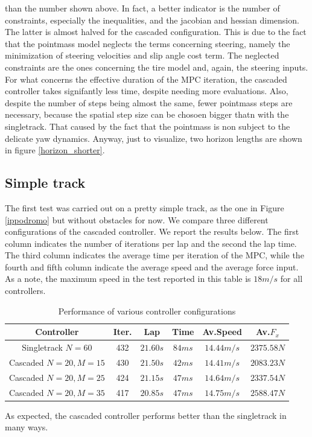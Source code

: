 \documentclass[a4paper, onecolumn, 12pt]{article}
\begin{document}
than the number shown above. In fact, a better indicator is the number of
constraints, especially the inequalities, and the jacobian and hessian
dimension. The latter is almost halved for the cascaded configuration. This is
due to the fact that the pointmass model neglects the terms concerning steering,
namely the minimization of steering velocities and slip angle cost term. The
neglected constraints are the ones concerning the tire model and, again, the
steering inputs. For what concerns the effective duration of the MPC iteration,
the cascaded controller takes signifantly less time, despite needing more
evaluations. Also, despite the number of steps being almost the same, fewer
pointmass steps are necessary, because the spatial step size can be chosoen
bigger thatn with the singletrack. That caused by the fact that the pointmass is
non subject to the delicate yaw dynamics. Anyway, just to visualize, two horizon
lengths are shown in figure \ref{horizon_shorter}.


\subsection{Simple track}

The first test was carried out on a pretty simple track, as the one in Figure
\ref{ippodromo} but without obstacles for now. We compare three different
configurations of the cascaded controller. We report the results below. The
first column indicates the number of iterations per lap and the second the lap
time. The third column indicates the average time per iteration of the MPC,
while the fourth and fifth column indicate the average speed and the average
force input. As a note, the maximum speed in the test reported in this table is
$18 m/s$ for all controllers.
\begin{table}[H] 
    \centering
    \caption{Performance of various controller configurations} \label{boh}
    \begin{tabular}{|c||c|c|c|c|c|}
        \hline
        \textbf{Controller} & \textbf{Iter.} & \textbf{Lap} & \textbf{Time} & \textbf{Av.Speed} & \textbf{Av.$F_x$} \\ [0.5ex] 
        \hline
        \hline
        Singletrack $N=60$ & 432 & $21.60 s$ & $84 ms$ & $14.44 m/s$ & $2375.58 N$\\
        \hline
        Cascaded $N=20, M=15$ & 430 & $21.50 s$ & $42 ms$ & $14.41 m/s$ & $2083.23 N$\\
        \hline
        Cascaded $N=20, M=25$ & 424 & $21.15 s$ & $47 ms$ & $14.64 m/s$ & $2337.54 N$\\
        \hline
        Cascaded $N=20, M=35$ & 417 & $20.85 s$ & $47 ms$ & $14.75 m/s$ & $2588.47 N$\\
        \hline
    \end{tabular}
\end{table}
As expected, the cascaded controller performs better than the singletrack in
many ways.
\end{document}
